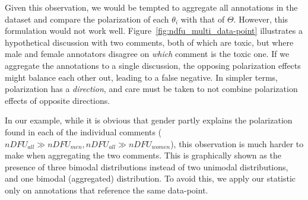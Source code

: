 \documentclass{article}
\begin{document}
Given this observation, we would be tempted to aggregate all annotations in the dataset and compare the polarization of each $\theta_i$ with that of $\Theta$. However, this formulation would not work well. Figure~\ref{fig:ndfu_multi_data-point} illustrates a hypothetical discussion with two comments, both of which are toxic, but where male and female annotators disagree on \emph{which} comment is the toxic one. If we aggregate the annotations to a single discussion, the opposing polarization effects might balance each other out, leading to a false negative. In simpler terms, polarization has a \textit{direction}, and care must be taken to not combine polarization effects of opposite directions.

In our example, while it is obvious that gender partly explains the polarization found in each of the individual comments ($nDFU_{all} \gg nDFU_{men}, nDFU_{all} \gg nDFU_{women}$), this observation is much harder to make when aggregating the two comments. This is graphically shown as the presence of three bimodal distributions instead of two unimodal distributions, and one bimodal (aggregated) distribution. To avoid this, we apply our statistic only on annotations that reference the same data-point.
\end{document}
